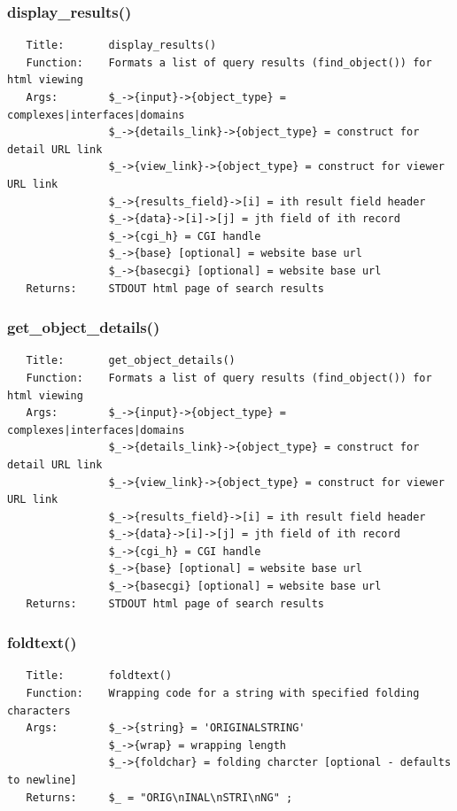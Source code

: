 \documentclass{article}
\begin{document}
\subsubsection*{display\_results()\label{pibase::web_display_results_}}
\begin{verbatim}
   Title:       display_results()
   Function:    Formats a list of query results (find_object()) for html viewing
   Args:        $_->{input}->{object_type} = complexes|interfaces|domains
                $_->{details_link}->{object_type} = construct for detail URL link
                $_->{view_link}->{object_type} = construct for viewer URL link
                $_->{results_field}->[i] = ith result field header
                $_->{data}->[i]->[j] = jth field of ith record
                $_->{cgi_h} = CGI handle
                $_->{base} [optional] = website base url
                $_->{basecgi} [optional] = website base url
   Returns:     STDOUT html page of search results
\end{verbatim}
\subsubsection*{get\_object\_details()\label{pibase::web_get_object_details_}}
\begin{verbatim}
   Title:       get_object_details()
   Function:    Formats a list of query results (find_object()) for html viewing
   Args:        $_->{input}->{object_type} = complexes|interfaces|domains
                $_->{details_link}->{object_type} = construct for detail URL link
                $_->{view_link}->{object_type} = construct for viewer URL link
                $_->{results_field}->[i] = ith result field header
                $_->{data}->[i]->[j] = jth field of ith record
                $_->{cgi_h} = CGI handle
                $_->{base} [optional] = website base url
                $_->{basecgi} [optional] = website base url
   Returns:     STDOUT html page of search results
\end{verbatim}
\subsubsection*{foldtext()\label{pibase::web_foldtext_}}
\begin{verbatim}
   Title:       foldtext()
   Function:    Wrapping code for a string with specified folding characters
   Args:        $_->{string} = 'ORIGINALSTRING'
                $_->{wrap} = wrapping length
                $_->{foldchar} = folding charcter [optional - defaults to newline]
   Returns:     $_ = "ORIG\nINAL\nSTRI\nNG" ;
\end{verbatim}
\end{document}
